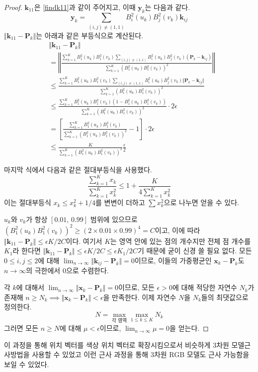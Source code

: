 \documentclass{gshs_thesis}
\theoremstyle{theorem}
\theoremstyle{lemma}
\theoremstyle{definition}
\begin{document}
\begin{proof}
	$\mathbf{k}_{11}$은 \eqref{findk11}과 같이 주어지고, 이때 $\mathbf{y}_k$는 다음과 같다.
	$$ \mathbf{y}_k = \sum_{(i, j) \neq (1, 1)} B_i^2(u_k) B_j^2(v_k) \mathbf{k}_{ij} $$ $\Vert \mathbf{k}_{11} - \mathbf{P}_k \Vert$는 아래과 같은 부등식으로 계산된다. 
	\begin{align*}
		&\Vert \mathbf{k}_{11} - \mathbf{P}_k \Vert \\
		&= \left\Vert \frac{\sum_{k=1}^K B_1^2(u_k) B_1^2(v_k) \sum_{(i, j) \neq (1, 1)} B_i^2(u_k) B_j^2(v_k) (\mathbf{P}_k - \mathbf{k}_{ij})}{\sum_{k=1}^K (B_1^2(u_k) B_1^2(v_k))^2} \right\Vert \\
		&\leq \frac{\sum_{k=1}^K B_1^2(u_k) B_1^2(v_k) \sum_{(i, j) \neq (1, 1)} B_i^2(u_k) B_j^2(v_k) \Vert \mathbf{P}_k - \mathbf{k}_{ij} \Vert}{\sum_{k=1}^K (B_1^2(u_k) B_1^2(v_k))^2} \\
		&\leq \frac{\sum_{k=1}^K B_1^2(u_k) B_1^2(v_k) (1 - B_1^2(u_k) B_1^2(v_k))}{\sum_{k=1}^K (B_1^2(u_k) B_1^2(v_k))^2} \cdot 2\epsilon \\
		&= \left[ \frac{\sum_{k=1}^K B_1^2(u_k) B_1^2(v_k)}{\sum_{k=1}^K (B_1^2(u_k) B_1^2(v_k))^2} - 1 \right] \cdot 2\epsilon \\
		&\leq \frac{K}{\sum_{k=1}^K (B_1^2(u_k) B_1^2(v_k))^2} \frac\epsilon2
	\end{align*}
	
	마지막 식에서 다음과 같은 절대부등식을 사용했다.
	$$ \frac{\sum_{k=1}^K x_k}{\sum_{k=1}^K x_k^2} \leq 1 + \frac{K}{4\sum_{k=1}^K x_k^2} $$
	이는 절대부등식 $x_k \leq x_k^2 + 1/4$를 변변이 더하고 $\sum x_k^2$으로 나누면 얻을 수 있다. 
	
	$u_k$와 $v_k$가 항상 $[0.01, \, 0.99]$ 범위에 있으므로 $(B_1^2(u_k) B_1^2(v_k))^2 \geq (2 \times 0.01 \times 0.99)^4 = C$이고, 이에 따라 $\Vert \mathbf{k}_{11} - \mathbf{P}_k \Vert \leq \epsilon K / 2C$이다. 여기서 $K$는 영역 안에 있는 점의 개수지만 전체 점 개수를 $K_{1}$라 한다면  $\Vert \mathbf{k}_{11} - \mathbf{P}_k \Vert \leq \epsilon K / 2C \leq \epsilon K_{1} / 2C$기 때문에 굳이 신경 쓸 필요 없다. 모든 $0 \leq i, j \leq 2$에 대해 $\lim_{n \to \infty} \Vert \mathbf{k}_{ij} - \mathbf{P}_k \Vert = 0$이므로, 이들의 가중평균인 $\mathbf{x}_k - \mathbf{P}_k$도 $n \to \infty$의 극한에서 $0$으로 수렴한다. 
	
	각 $k$에 대해서 $\lim_{n \to \infty} \Vert \mathbf{x}_k - \mathbf{P}_k \Vert = 0$이므로, 모든 $\epsilon > 0$에 대해 적당한 자연수 $N_k$가 존재해 $n \geq N_k \implies \Vert \mathbf{x}_k - \mathbf{P}_k \Vert < \epsilon$을 만족한다. 이제 자연수 $N$을 $N_k$들의 최댓값으로 정의한다. 
	$$ N = \max_{\text{각 영역}} \max_{1 \leq k \leq K} N_k $$
	그러면 모든 $n \geq N$에 대해 $\mu < \epsilon$이므로, $\lim_{n \to \infty} \mu = 0$을 얻는다. 
\end{proof}
이 과정을 통해 위치 벡터를 색상 위치 벡터로 확장시킴으로서 비슷하게 3차원 모델근사방법을 사용할 수 있었고 이런 근사 과정을 통해 3차원 RGB 모델도 근사 가능함을 보일 수 있었다.
\end{document}
